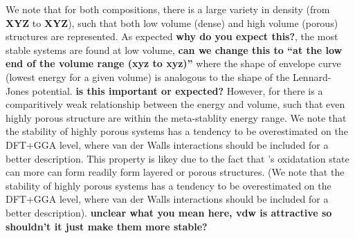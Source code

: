 We note that for both compositions,
there is a large variety in density (from \textbf{XYZ} to \textbf{XYZ}),
such that both low volume (dense) and high volume (porous) structures are represented.
%
As expected \textbf{why do you expect this?}, the most stable systems are found at low volume, \textbf{can we change this to ``at the low end of the volume range (xyz to xyz)''}
where the shape of envelope curve (lowest energy for a given volume) is analogous to the shape of the Lennard-Jones potential. \textbf{is this important or expected?}
%
However, for \IrOthree there is a comparitively weak relationship between the energy and volume,
such that even highly porous structure are within the meta-stablity energy range.
%
We note that the stability of highly porous systems has a tendency to be overestimated on the DFT+GGA level, where van der Walls interactions should be included for a better description.
%
This property is likey due to the fact that \IrOthree's oxidatation state can more can form readily form layered or porous structures.
%
(We note that the stability of highly porous systems has a tendency to be overestimated on the DFT+GGA level, where van der Walls interactions should be included for a better description). \textbf{unclear what you mean here, vdw is attractive so shouldn't it just make them more stable?}


